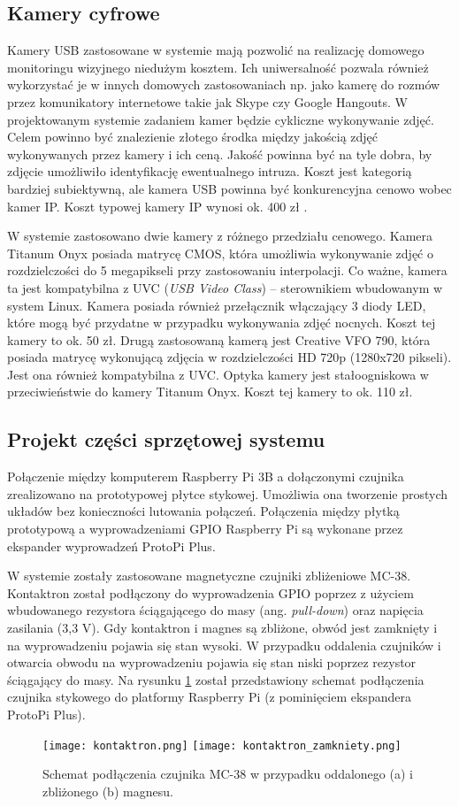 \documentclass[a4paper,11pt,twoside]{article}
\begin{document}
\subsection{Kamery cyfrowe}
Kamery USB zastosowane w systemie mają pozwolić na realizację domowego monitoringu wizyjnego niedużym kosztem. Ich uniwersalność pozwala również wykorzystać je w innych domowych zastosowaniach np. jako kamerę do rozmów przez komunikatory internetowe takie jak Skype czy Google Hangouts. W projektowanym systemie zadaniem kamer będzie cykliczne wykonywanie zdjęć. Celem powinno być znalezienie złotego środka między jakością zdjęć wykonywanych przez kamery i ich ceną. Jakość powinna być na tyle dobra, by zdjęcie umożliwiło identyfikację ewentualnego intruza. Koszt jest kategorią bardziej subiektywną, ale kamera USB powinna być konkurencyjna cenowo wobec kamer IP. Koszt typowej kamery IP wynosi ok. 400 zł \cite{komputer_świat}.

W systemie zastosowano dwie kamery z różnego przedziału cenowego. Kamera Titanum Onyx posiada matrycę CMOS, która umożliwia wykonywanie zdjęć o rozdzielczości do 5 megapikseli przy zastosowaniu interpolacji. Co ważne, kamera ta jest kompatybilna z UVC (\textit{USB Video Class}) -- sterownikiem wbudowanym w system Linux. Kamera posiada również przełącznik włączający 3 diody LED, które mogą być przydatne w przypadku wykonywania zdjęć nocnych. Koszt tej kamery to ok. 50 zł. Drugą zastosowaną kamerą jest Creative VFO 790, która posiada matrycę wykonującą zdjęcia w rozdzielczości HD 720p (1280x720 pikseli). Jest ona również kompatybilna z UVC. Optyka kamery jest stałoogniskowa w przeciwieństwie do kamery Titanum Onyx. Koszt tej kamery to ok. 110 zł.

\subsection{Projekt części sprzętowej systemu}
Połączenie między komputerem Raspberry Pi 3B a dołączonymi czujnika zrealizowano na prototypowej płytce stykowej. Umożliwia ona tworzenie prostych układów bez konieczności lutowania połączeń. Połączenia między płytką prototypową a wyprowadzeniami GPIO Raspberry Pi są wykonane przez ekspander wyprowadzeń ProtoPi Plus.

W systemie zostały zastosowane magnetyczne czujniki zbliżeniowe MC-38. Kontaktron został podłączony do wyprowadzenia GPIO poprzez z użyciem wbudowanego rezystora ściągającego do masy (ang. \textit{pull-down}) oraz napięcia zasilania (3,3 V). Gdy kontaktron i magnes są zbliżone, obwód jest zamknięty i na wyprowadzeniu pojawia się stan wysoki. W przypadku oddalenia czujników i otwarcia obwodu na wyprowadzeniu pojawia się stan niski poprzez rezystor ściągający do masy. Na rysunku \ref{fig: kontaktron} został przedstawiony schemat podłączenia czujnika stykowego do platformy Raspberry Pi (z pominięciem ekspandera ProtoPi Plus).
\begin{figure}[h]
\texttt{[image: kontaktron.png]}
\texttt{[image: kontaktron\_zamkniety.png]}
\caption{Schemat podłączenia czujnika MC-38 w przypadku oddalonego (a) i zbliżonego (b) magnesu.}
\label{fig: kontaktron}
\end{figure}
\end{document}
